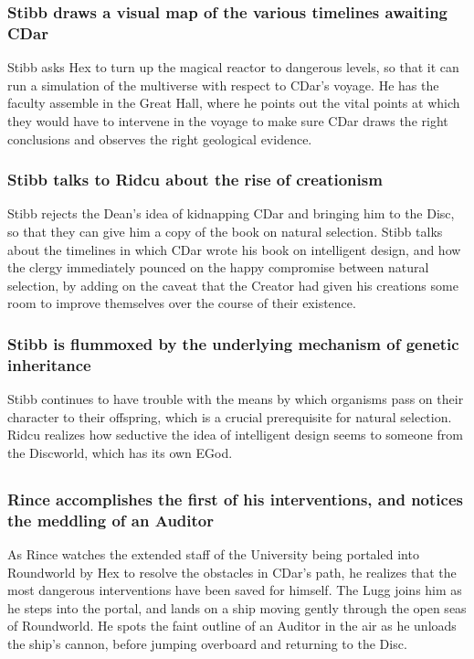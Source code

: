 \subsubsection{\Gls{Stibb} draws a visual map of the various timelines awaiting \Gls{CDar}}
\Gls{Stibb} asks \Gls{Hex} to turn up the magical reactor to dangerous levels, so that it can run a
simulation of the multiverse with respect to \Gls{CDar}'s voyage. He has the faculty assemble in the
Great Hall, where he points out the vital points at which they would have to intervene in the voyage
to make sure \Gls{CDar} draws the right conclusions and observes the right geological evidence.

\subsubsection{\Gls{Stibb} talks to \Gls{Ridcu} about the rise of creationism}
\Gls{Stibb} rejects the \Gls{Dean}'s idea of kidnapping \Gls{CDar} and bringing him to the Disc, so
that they can give him a copy of the book on natural selection. \Gls{Stibb} talks about the
timelines in which \Gls{CDar} wrote his book on intelligent design, and how the clergy immediately
pounced on the happy compromise between natural selection, by adding on the caveat that the Creator
had given his creations some room to improve themselves over the course of their existence.

\subsubsection{\Gls{Stibb} is flummoxed by the underlying mechanism of genetic inheritance}
\Gls{Stibb} continues to have trouble with the means by which organisms pass on their
character to their offspring, which is a crucial prerequisite for natural selection. \Gls{Ridcu}
realizes how seductive the idea of intelligent design seems to someone from the Discworld, which
has its own \Gls{EGod}.

\subsection{}
\subsubsection{\Gls{Rince} accomplishes the first of his interventions, and notices the meddling
    of an Auditor}
As \Gls{Rince} watches the extended staff of the University being portaled into Roundworld by
\Gls{Hex} to resolve the obstacles in \Gls{CDar}'s path, he realizes that the most dangerous
interventions have been saved for himself. The \Gls{Lugg} joins him as he steps into the portal,
and lands on a ship moving gently through the open seas of Roundworld. He spots the faint outline of
an Auditor in the air as he unloads the ship's cannon, before jumping overboard and returning to the
Disc.

